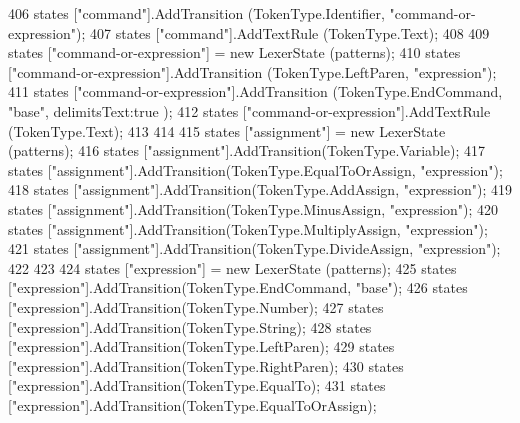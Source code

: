 \begin{DoxyCode}
406             states [\textcolor{stringliteral}{"command"}].AddTransition (TokenType.Identifier, \textcolor{stringliteral}{"command-or-expression"});
407             states [\textcolor{stringliteral}{"command"}].AddTextRule (TokenType.Text);
408 
409             states [\textcolor{stringliteral}{"command-or-expression"}] = \textcolor{keyword}{new} LexerState (patterns);
410             states [\textcolor{stringliteral}{"command-or-expression"}].AddTransition (TokenType.LeftParen, \textcolor{stringliteral}{"expression"});
411             states [\textcolor{stringliteral}{"command-or-expression"}].AddTransition (TokenType.EndCommand, \textcolor{stringliteral}{"base"}, delimitsText:\textcolor{keyword}{true}
      );
412             states [\textcolor{stringliteral}{"command-or-expression"}].AddTextRule (TokenType.Text);
413 
414 
415             states [\textcolor{stringliteral}{"assignment"}] = \textcolor{keyword}{new} LexerState (patterns);
416             states [\textcolor{stringliteral}{"assignment"}].AddTransition(TokenType.Variable);
417             states [\textcolor{stringliteral}{"assignment"}].AddTransition(TokenType.EqualToOrAssign, \textcolor{stringliteral}{"expression"});
418             states [\textcolor{stringliteral}{"assignment"}].AddTransition(TokenType.AddAssign, \textcolor{stringliteral}{"expression"});
419             states [\textcolor{stringliteral}{"assignment"}].AddTransition(TokenType.MinusAssign, \textcolor{stringliteral}{"expression"});
420             states [\textcolor{stringliteral}{"assignment"}].AddTransition(TokenType.MultiplyAssign, \textcolor{stringliteral}{"expression"});
421             states [\textcolor{stringliteral}{"assignment"}].AddTransition(TokenType.DivideAssign, \textcolor{stringliteral}{"expression"});
422 
423 
424             states [\textcolor{stringliteral}{"expression"}] = \textcolor{keyword}{new} LexerState (patterns);
425             states [\textcolor{stringliteral}{"expression"}].AddTransition(TokenType.EndCommand, \textcolor{stringliteral}{"base"});
426             states [\textcolor{stringliteral}{"expression"}].AddTransition(TokenType.Number);
427             states [\textcolor{stringliteral}{"expression"}].AddTransition(TokenType.String);
428             states [\textcolor{stringliteral}{"expression"}].AddTransition(TokenType.LeftParen);
429             states [\textcolor{stringliteral}{"expression"}].AddTransition(TokenType.RightParen);
430             states [\textcolor{stringliteral}{"expression"}].AddTransition(TokenType.EqualTo);
431             states [\textcolor{stringliteral}{"expression"}].AddTransition(TokenType.EqualToOrAssign);

\end{DoxyCode}
